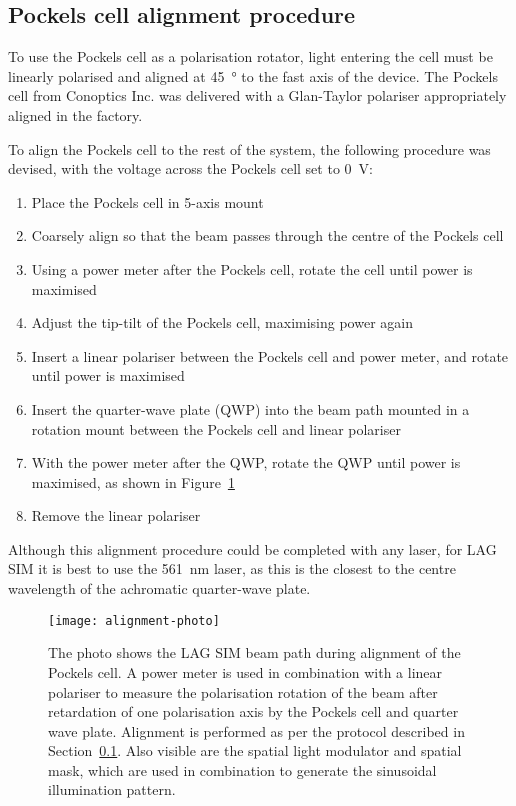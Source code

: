 \subsection{Pockels cell alignment procedure} \label{sec:alignment-procedure}
To use the Pockels cell as a polarisation rotator, light entering the cell must be linearly polarised and aligned at \SI{45}{\degree} to the fast axis of the device. 
The Pockels cell from Conoptics Inc. was delivered with a Glan-Taylor polariser appropriately aligned in the factory. 

To align the Pockels cell to the rest of the system, the following procedure was devised, with the voltage across the Pockels cell set to \SI{0}{\volt}: %
\begin{enumerate}
	\item Place the Pockels cell in 5-axis mount
	\item Coarsely align so that the beam passes through the centre of the Pockels cell
	\item Using a power meter after the Pockels cell, rotate the cell until power is maximised
	\item Adjust the tip-tilt of the Pockels cell, maximising power again
	\item Insert a linear polariser between the Pockels cell and power meter, and rotate until power is maximised
	\item Insert the quarter-wave plate (QWP) into the beam path mounted in a rotation mount between the Pockels cell and linear polariser
	\item With the power meter after the QWP, rotate the QWP until power is maximised, as shown in Figure~\ref{fig:alignment-photo}
	\item Remove the linear polariser
\end{enumerate}

Although this alignment procedure could be completed with any laser, for LAG SIM it is best to use the \SI{561}{\nano\metre} laser, as this is the closest to the centre wavelength of the achromatic quarter-wave plate. 

\begin{figure}[htbp!]
\centering
\texttt{[image: alignment-photo]}
\caption[LAG SIM: Alignment of the Pockels cell and quarter-wave plate to facilitate fast linear polarisation rotation]{The photo shows the LAG SIM beam path during alignment of the Pockels cell. A power meter is used in combination with a linear polariser to measure the polarisation rotation of the beam after retardation of one polarisation axis by the Pockels cell and quarter wave plate. Alignment is performed as per the protocol described in Section~\ref{sec:alignment-procedure}. Also visible are the spatial light modulator and spatial mask, which are used in combination to generate the sinusoidal illumination pattern.}
\label{fig:alignment-photo}
\end{figure}


